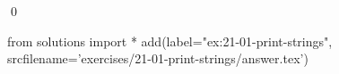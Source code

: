 
\begin{ex}
  \label{ex:21-01-print-strings}
  
  \qed
\end{ex}
\begin{python0}
from solutions import *
add(label="ex:21-01-print-strings",
    srcfilename='exercises/21-01-print-strings/answer.tex')
\end{python0}
